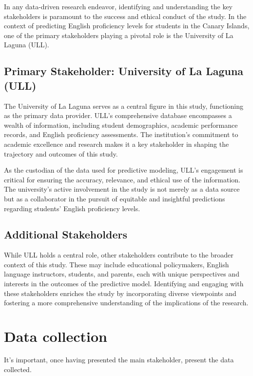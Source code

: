 \documentclass[12pt,a4paper,openright,twoside]{book}
\begin{document}
In any data-driven research endeavor, identifying and understanding the key stakeholders is paramount to the success and ethical conduct of the study. In the context of predicting English proficiency levels for students in the Canary Islands, one of the primary stakeholders playing a pivotal role is the University of La Laguna (ULL).

\subsection{Primary Stakeholder: University of La Laguna (ULL)}

The University of La Laguna serves as a central figure in this study, functioning as the primary data provider. ULL's comprehensive database encompasses a wealth of information, including student demographics, academic performance records, and English proficiency assessments. The institution's commitment to academic excellence and research makes it a key stakeholder in shaping the trajectory and outcomes of this study.

As the custodian of the data used for predictive modeling, ULL's engagement is critical for ensuring the accuracy, relevance, and ethical use of the information. The university's active involvement in the study is not merely as a data source but as a collaborator in the pursuit of equitable and insightful predictions regarding students' English proficiency levels.

\subsection{Additional Stakeholders}

While ULL holds a central role, other stakeholders contribute to the broader context of this study. These may include educational policymakers, English language instructors, students, and parents, each with unique perspectives and interests in the outcomes of the predictive model. Identifying and engaging with these stakeholders enriches the study by incorporating diverse viewpoints and fostering a more comprehensive understanding of the implications of the research.

\section{Data collection}

It's important, once having presented the main stakeholder, present the data collected.
\end{document}
